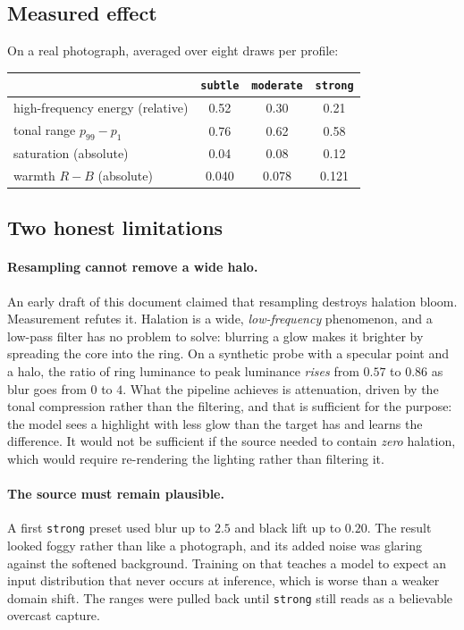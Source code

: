 \documentclass[11pt,a4paper]{article}
\newcommand{\code}[1]{\texttt{#1}}
\begin{document}
\subsection{Measured effect}

On a real photograph, averaged over eight draws per profile:

\begin{center}
\begin{tabular}{@{}lccc@{}}
\toprule
 & \code{subtle} & \code{moderate} & \code{strong} \\
\midrule
high-frequency energy (relative) & 0.52 & 0.30 & 0.21 \\
tonal range $p_{99}-p_1$         & 0.76 & 0.62 & 0.58 \\
saturation (absolute)            & 0.04 & 0.08 & 0.12 \\
warmth $R-B$ (absolute)          & 0.040 & 0.078 & 0.121 \\
\bottomrule
\end{tabular}
\end{center}

\subsection{Two honest limitations}

\paragraph{Resampling cannot remove a wide halo.}
An early draft of this document claimed that resampling destroys halation bloom.
Measurement refutes it. Halation is a wide, \emph{low-frequency} phenomenon, and a
low-pass filter has no problem to solve: blurring a glow makes it brighter by
spreading the core into the ring. On a synthetic probe with a specular point and a
halo, the ratio of ring luminance to peak luminance \emph{rises} from $0.57$ to
$0.86$ as blur goes from $0$ to $4$. What the pipeline achieves is attenuation,
driven by the tonal compression rather than the filtering, and that is sufficient
for the purpose: the model sees a highlight with less glow than the target has and
learns the difference. It would not be sufficient if the source needed to contain
\emph{zero} halation, which would require re-rendering the lighting rather than
filtering it.

\paragraph{The source must remain plausible.}
A first \code{strong} preset used blur up to $2.5$ and black lift up to $0.20$.
The result looked foggy rather than like a photograph, and its added noise was
glaring against the softened background. Training on that teaches a model to
expect an input distribution that never occurs at inference, which is worse than
a weaker domain shift. The ranges were pulled back until \code{strong} still reads
as a believable overcast capture.
\end{document}
